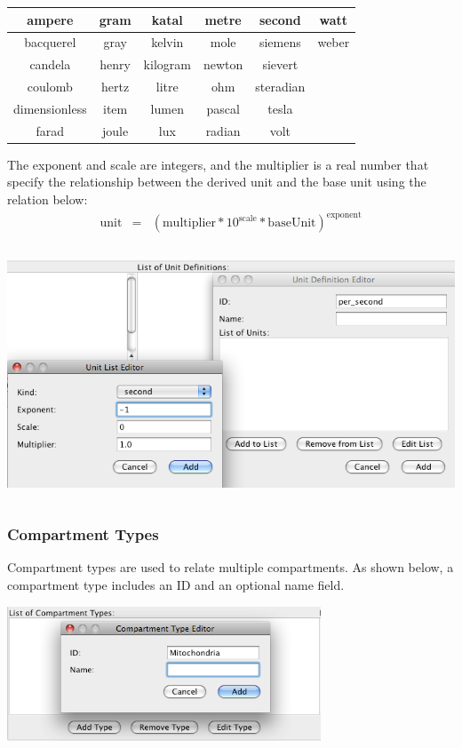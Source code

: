 \documentclass[titlepage,11pt]{article}
\begin{document}
\begin{center}
\begin{tabular}{|c|c|c|c|c|c|}
\hline
ampere        & gram  & katal    & metre  & second    & watt \\ \hline
bacquerel     & gray  & kelvin   & mole   & siemens   & weber \\ \hline
candela       & henry & kilogram & newton & sievert   & ~\\ \hline
coulomb       & hertz & litre    & ohm    & steradian & ~\\ \hline
dimensionless & item  & lumen    & pascal & tesla     & ~\\ \hline
farad         & joule & lux      & radian & volt      & ~\\ \hline
\end{tabular}
\end{center}

The exponent and scale are integers, and the multiplier is a real
number that specify the relationship between the derived unit and the
base unit using the relation below:
\begin{eqnarray*}
\mathrm{unit} & = & (\mathrm{multiplier} * 10^\mathrm{scale} * \mathrm{baseUnit})^\mathrm{exponent}
\end{eqnarray*}
\begin{center}
\includegraphics[height=75mm]{screenshots/units}
\end{center}

\subsubsection{\label{compTypes}Compartment Types}

\noindent
Compartment types are used to relate multiple compartments.  As shown
below, a compartment type includes an ID and an optional name field.
\begin{center}
\includegraphics[height=40mm]{screenshots/compType}
\end{center}
\end{document}
